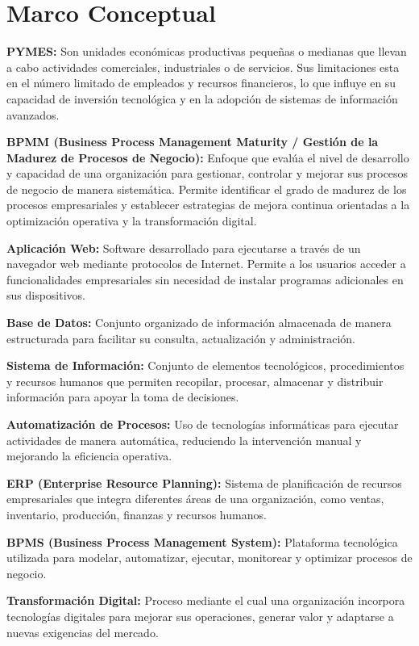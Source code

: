 \section{Marco Conceptual}

\textbf{PYMES:} Son unidades económicas productivas pequeñas o medianas que llevan a cabo actividades comerciales, industriales o de servicios. Sus limitaciones esta en el número limitado de empleados y recursos financieros, lo que influye en su capacidad de inversión tecnológica y en la adopción de sistemas de información avanzados.

\textbf{BPMM (Business Process Management Maturity / Gestión de la Madurez de Procesos de Negocio):} Enfoque que evalúa el nivel de desarrollo y capacidad de una organización para gestionar, controlar y mejorar sus procesos de negocio de manera sistemática. Permite identificar el grado de madurez de los procesos empresariales y establecer estrategias de mejora continua orientadas a la optimización operativa y la transformación digital.


\textbf{Aplicación Web:} Software desarrollado para ejecutarse a través de un navegador web mediante protocolos de Internet. Permite a los usuarios acceder a funcionalidades empresariales sin necesidad de instalar programas adicionales en sus dispositivos.

\textbf{Base de Datos:} Conjunto organizado de información almacenada de manera estructurada para facilitar su consulta, actualización y administración.

\textbf{Sistema de Información:} Conjunto de elementos tecnológicos, procedimientos y recursos humanos que permiten recopilar, procesar, almacenar y distribuir información para apoyar la toma de decisiones.

\textbf{Automatización de Procesos:} Uso de tecnologías informáticas para ejecutar actividades de manera automática, reduciendo la intervención manual y mejorando la eficiencia operativa.

\textbf{ERP (Enterprise Resource Planning):} Sistema de planificación de recursos empresariales que integra diferentes áreas de una organización, como ventas, inventario, producción, finanzas y recursos humanos.

\textbf{BPMS (Business Process Management System):} Plataforma tecnológica utilizada para modelar, automatizar, ejecutar, monitorear y optimizar procesos de negocio.

\textbf{Transformación Digital:} Proceso mediante el cual una organización incorpora tecnologías digitales para mejorar sus operaciones, generar valor y adaptarse a nuevas exigencias del mercado.

